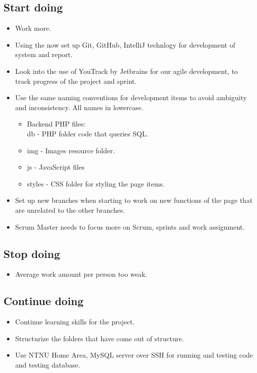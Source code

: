 \subsection{Start doing}
\label{subsec:S2RetrospectiveStart}
\begin{itemize}
\item Work more. 
\item Using the now set up Git, GitHub, IntelliJ technlogy for development of system and report.
\item Look into the use of YouTrack by Jetbrains for our agile development, to track progress of the project and sprint. 
\item Use the same naming conventions for development items to avoid ambiguity and inconsistency. All names in lowercase. 
\begin{itemize}
\item Backend PHP files: \\ db - PHP folder code that queries SQL. 
\item img - Images resource folder. 
\item js - JavaScript files
\item styles - CSS folder for styling the page items. 
\end{itemize}
\item Set up new branches when starting to work on new functions of the page that are unrelated to the other branches. 
\item Scrum Master needs to focus more on Scrum, sprints and work assignment. \\
\end{itemize}

\subsection{Stop doing}
\label{subsec:S2RetrospectiveStop}
\begin{itemize}
\item Average work amount per person too weak.  \\
\end{itemize}

\subsection{Continue doing}
\label{subsec:S2RetrospectiveContinue}
\begin{itemize}
\item Continue learning skills for the project.
\item Structurize the folders that have come out of structure. 
\item Use NTNU Home Area, MySQL server over SSH for running and testing code and testing database. \\
\end{itemize}

